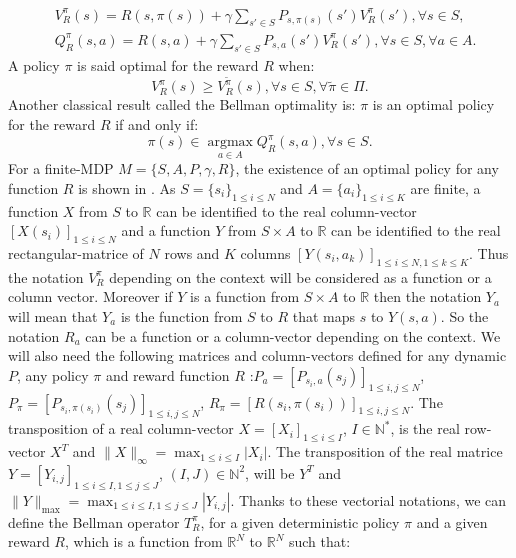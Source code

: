 \documentclass{article} %
\newcommand{\argmax}{\operatorname*{argmax}}
\newcommand{\0}{\mathbf{0}}
\newcommand{\1}{\mathbf{1}}
\begin{document}
\begin{align}
\label{equation: Bellman}
&V^{\pi}_R(s)=R(s,\pi(s))+\gamma\sum_{s'\in S}P_{s,\pi(s)}(s')V^{\pi}_R(s'), \forall s\in S,
\\
&Q^{\pi}_R(s,a)=R(s,a)+\gamma\sum_{s'\in S}P_{s,a}(s')V^{\pi}_R(s'), \forall s\in S, \forall a\in A.
\end{align}
A policy $\pi$ is said optimal for the reward $R$ when:
\begin{equation}
\label{equation:Voptimal}
V^{\pi}_R(s)\geq V^{\tilde{\pi}}_R(s) , \forall s\in S, \forall \tilde{\pi}\in\Pi.
\end{equation}
Another classical result called the Bellman optimality is: $\pi$ is an optimal policy for the reward $R$ if and only if:
\begin{equation}
\label{equation:Qoptimal}
\pi(s)\in\argmax_{a\in A} Q^\pi_R(s,a), \forall s\in S.
\end{equation}
For a finite-MDP $M=\{S,A,P,\gamma,R\}$, the existence of an optimal policy for any function $R$ is shown in \cite{bertsekas2001dynamic}.
As $S=\{s_i\}_{1\leq i \leq N}$ and $A=\{a_i\}_{1\leq i \leq K}$ are finite, a function $X$ from $S$ to $\mathbb{R}$ can be identified to the real column-vector $[X(s_i)]_{1\leq i \leq N}$ and a function $Y$ from
$S\times A$ to $\mathbb{R}$ can be identified to the real rectangular-matrice of $N$ rows and $K$ columns  $[Y(s_i,a_k)]_{1\leq i \leq N, 1\leq k \leq K}$.
Thus the notation $V^\pi_R$ depending on the context will be considered as a function or a column vector. Moreover if $Y$ is a function from $S\times A$ to $\mathbb{R}$ then the notation $Y_a$ will mean that $Y_a$ is the function from $S$ to $R$ that maps $s$ to $Y(s,a)$. So the notation $R_a$ can be a function or a column-vector depending on the context.
We will also need the following matrices and column-vectors defined for any dynamic $P$, any policy $\pi$ and reward function $R$ :$P_a=[P_{s_i,a}(s_j)]_{1\leq i,j \leq N}$, $P_\pi=[P_{s_i,\pi(s_i)}(s_j)]_{1\leq i,j \leq N}$, $R_\pi=[R(s_i,\pi(s_i))]_{1\leq i,j \leq N}$. The transposition of a real column-vector $X=[X_i]_{1\leq i \leq I}$, $I\in\mathbb{N}^*$, is the real row-vector $X^T$ and $\|X\|_{\infty}=\max_{1\leq i \leq I}|X_i|$. The transposition of the real matrice $Y=[Y_{i,j}]_{1\leq i \leq I, 1\leq j \leq J}$, $(I,J)\in\mathbb{N}^2$, will be $Y^T$ and $\|Y\|_{\text{max}}=\max_{1\leq i \leq I,1\leq j \leq J}|Y_{i,j}|$.  Thanks to these vectorial notations, we can define the Bellman operator $T^\pi_R$, for a given deterministic policy $\pi$ and a given reward $R$, which is a function from $\mathbb{R}^N$ to $\mathbb{R}^N$ such that:
\end{document}
